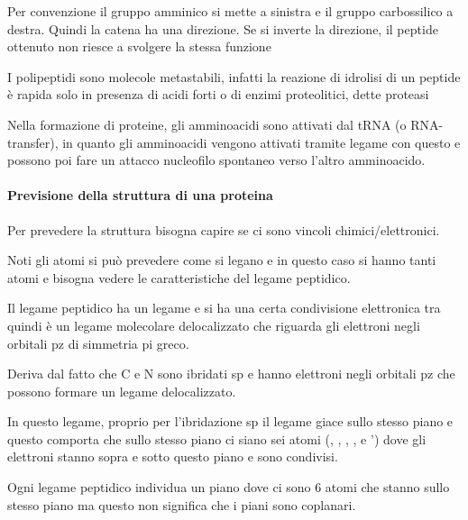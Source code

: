 Per convenzione il gruppo amminico si mette a sinistra e il gruppo
carbossilico a destra. Quindi la catena ha una direzione. Se si inverte
la direzione, il peptide ottenuto non riesce a svolgere la stessa
funzione



I polipeptidi sono molecole metastabili, infatti la reazione di idrolisi di un peptide è rapida solo in presenza di acidi forti o di
enzimi proteolitici, dette proteasi

Nella formazione di proteine, gli amminoacidi sono attivati dal tRNA (o
RNA-transfer), in quanto gli amminoacidi vengono attivati tramite legame con questo e possono poi
fare un attacco nucleofilo spontaneo verso l'altro amminoacido.


\paragraph{Previsione della struttura di una proteina}

Per prevedere la struttura bisogna capire se ci sono vincoli
chimici/elettronici.

Noti gli atomi si può prevedere come si legano e in questo caso si hanno
tanti atomi e bisogna vedere le caratteristiche del legame peptidico.

Il legame peptidico ha un legame  e si ha una certa condivisione
elettronica tra  quindi è un legame molecolare delocalizzato che
riguarda gli elettroni negli orbitali pz di simmetria pi greco.

Deriva dal fatto che C e N sono ibridati sp e hanno
elettroni negli orbitali pz che possono formare un legame delocalizzato.

In questo legame, proprio per l'ibridazione sp il
legame  giace sullo stesso piano e questo comporta che sullo
stesso piano ci siano sei atomi (, , , ,  e \ped{\alpha}') dove gli elettroni \pi{} stanno sopra e sotto questo
piano e sono condivisi.


Ogni legame peptidico individua un piano dove ci sono 6 atomi che stanno
sullo stesso piano ma questo non significa che i piani sono coplanari.

